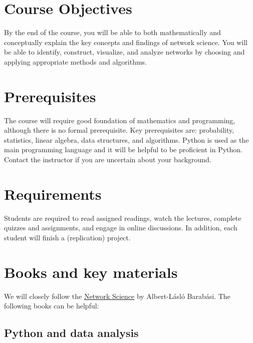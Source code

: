 \documentclass[11pt,article,oneside]{memoir}
\begin{document}
\section{Course Objectives}

By the end of the course, you will be able to both mathematically and
conceptually explain the key concepts and findings of network science. You will
be able to identify, construct, visualize, and analyze networks by choosing and
applying appropriate methods and algorithms.   

\section{Prerequisites}
\label{sec:Prerequisites}

The course will require good foundation of mathematics and programming,
although there is no formal prerequisite. Key prerequisites are: probability,
statistics, linear algebra, data structures, and algorithms. Python is used as
the main programming language and it will be helpful to be proficient in
Python. Contact the instructor if you are uncertain about your background.

\section{Requirements}
\label{sec:requirements}

Students are required to read assigned readings, watch the lectures, complete
quizzes and assignments, and engage in online discussions. In addition, each
student will finish a (replication) project. 

\section{Books and key materials}

We will closely follow the
\href{http://barabasi.com/networksciencebook/}{Network Science} by Albert-Lásló
Barabási. The following books can be helpful:

\subsection{Python and data analysis}
\end{document}
